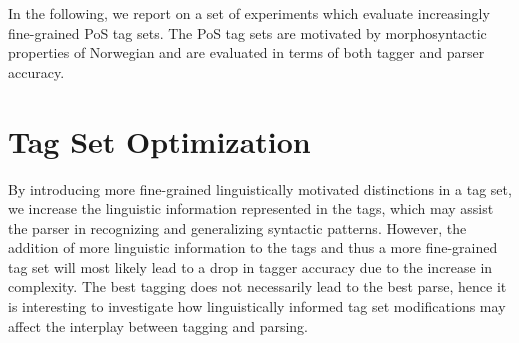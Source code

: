 \documentclass[11pt,a4paper]{article}
\begin{document}
In the following, we report on a set of experiments which evaluate increasingly
fine-grained PoS tag sets. The PoS tag sets are motivated by morphosyntactic
properties of Norwegian and are evaluated in terms of both tagger and parser
accuracy.

\section{Tag Set Optimization}
\label{sec:optimization}
By introducing more fine-grained linguistically motivated distinctions in a tag
set, we increase the linguistic information represented in the tags, which may
assist the parser in recognizing and generalizing syntactic patterns. However,
the addition of more linguistic information to the tags and thus a more
fine-grained tag set will most likely lead to a drop in tagger accuracy due to
the increase in complexity. The best tagging does not necessarily lead to the
best parse, hence it is interesting to investigate how linguistically informed
tag set modifications may affect the interplay between tagging and parsing.
\end{document}
